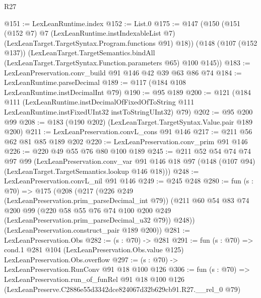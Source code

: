 \begin{lexlean}{R27}
\begin{coremodule}
@151 := LexLeanRuntime.index
@152 := List.{0}
@175 := @147
    (@150
      (@151
        (@152 @7)
        @7
        (LexLeanRuntime.instIndexableList @7)
        (LexLeanTarget.TargetSyntax.Program.functions @91)
        @18))
    (@148
      (@107 (@152 @137))
      (LexLeanTarget.TargetSemantics.bindAll
        (LexLeanTarget.TargetSyntax.Function.parameters @65)
        @100
        @145))
@183 := LexLeanPreservation.conv_build @91 @146 @42 @39 @63 @86 @74
@184 := LexLeanRuntime.parseDecimal
@189 := @117 (@184 @108 LexLeanRuntime.instDecimalInt @79)
@190 := @95 @189
@200 := @121
    (@184
      @111
      (LexLeanRuntime.instDecimalOfFixedOfToString
        @111
        LexLeanRuntime.instFixedUInt32
        instToStringUInt32)
      @79)
@202 := @95 @200 @99
@208 := @183 (@190 @202) (LexLeanTarget.TargetSyntax.Value.pair @189 @200)
@211 := LexLeanPreservation.convL_cons @91 @146
@217 := @211 @56 @62 @81 @85 @189 @202
@220 := LexLeanPreservation.conv_prim @91 @146
@226 := @220 @49 @55 @76 @80 @100 @189
@245 := @211
    @52
    @54
    @74
    @74
    @97
    @99
    (LexLeanPreservation.conv_var
      @91
      @146
      @18
      @97
      (@148 (@107 @94) (LexLeanTarget.TargetSemantics.lookup @146 @18)))
@248 := LexLeanPreservation.convL_nil @91 @146
@249 := @245 @248
@280 := fun (s : @70) =>
  @175
    (@208
      (@217
        (@226 @249 (LexLeanPreservation.prim_parseDecimal_int @79))
        (@211
          @60
          @54
          @83
          @74
          @200
          @99
          (@220 @58 @55 @76 @74 @100 @200 @249 (LexLeanPreservation.prim_parseDecimal_u32 @79))
          @248))
      (LexLeanPreservation.construct_pair @189 @200))
@281 := LexLeanPreservation.Obs
@282 := (s : @70) -> @281
@291 := fun (s : @70) =>
  cond.{1} @281 @104 (LexLeanPreservation.Obs.value @125) LexLeanPreservation.Obs.overflow
@297 := (s : @70) -> LexLeanPreservation.RunConv @91 @18 @100 @126
@306 := fun (s : @70) =>
  LexLeanPreservation.run_of_funRel
    @91
    @18
    @100
    @126
    (LexLeanPreserve.C2886e55d3342dce824067d32b629cb91.R27.__rel_0 @79)
\end{coremodule}
\end{lexlean}
